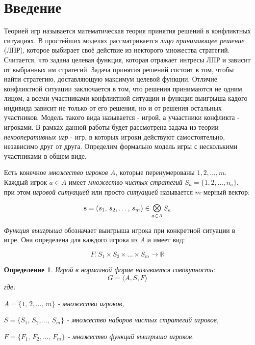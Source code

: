 \section{Введение}

Теорией игр называется математическая теория принятия решений
в конфликтных ситуациях. В простейших моделях рассматривается \textit{лицо
принимающее решение} (ЛПР), которое выбирает своё действие из некторого
множества стратегий. Считается, что задана целевая функция,
которая отражает интресы ЛПР и зависит от выбранных им стратегий.
Задача принятия решений состоит в том, чтобы найти стратегию, 
доставляющую максимум целевой функции. Отличие конфликтной ситуации
заключается в том, что решения принимаются не одним лицом, 
а всеми участниками конфликтной ситуации и функция выигрыша
кадого индивида зависит не только от его решения, но 
и от решения остальных участников.  Модель такого вида называется -
игрой, а учаастники конфликта - игроками. В рамках данной работы
будет рассмотрена задача из теории \textit{некооперативных игр} - 
игр, в которых игроки действуют самостоятельно, независимо друг 
от друга. Определим формально модель игры с несколькими участниками в общем виде.

Есть конечное \textit{множество игроков} $A$, которые перенумерованы
$1, 2, ..., m$. Каждый игрок $a \in A$ имеет 
\textit{множество чистых стратегий} $S_a=\{1,2,...,n_a\}$, при этом 
\textit{игровой ситуацией} или просто \textit{ситуацией}
называется $m$-мерный вектор:

\begin{equation}
	\textbf{s} = (s_1, \, s_2, \ldots , \, s_m) \in
	\Motimes_{a \in A} S_a
	\label{eq:game_situation}
\end{equation}

\textit{Функция выигрыша} обозначает выигрыша игрока при конкретной ситуации в игре. Она определена для каждого игрока из $A$ и имеет вид:

\begin{equation}
	F: S_1 \times S_2 \times ... \times S_m \rightarrow \mathbb R
	\label{eq:single_dim_payoff_function}
\end{equation}

\newtheorem{Def}{Определение}
\begin{Def}
	Игрой в нормалной форме называется совокупность:
	\begin{equation}
		G = \big \langle A, S, F \big \rangle
		\label{eq:normal_form_game}
	\end{equation}
	где: 
 
	$ A = \{1, \, 2, ..., \, m\}$ - множество игроков,

	$ S = \{S_1, \, S_2, ..., \, S_m\}$ - множество наборов чистых
	стратегий игроков,

	$ F = \{F_1, \, F_2, ..., \, F_m\}$ - множество функций выигрыша
	игроков.
\end{Def}

